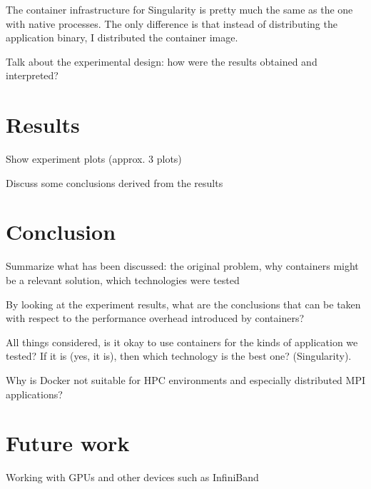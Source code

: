 \documentclass[12pt]{article}
\begin{document}
The container infrastructure for Singularity is pretty much the same
as the one with native processes. The only difference is that instead
of distributing the application binary, I distributed the container
image.

Talk about the experimental design: how were the results obtained and
interpreted?

\section{Results}
Show experiment plots (approx. 3 plots)

Discuss some conclusions derived from the results

\section{Conclusion}
Summarize what has been discussed: the original problem, why
containers might be a relevant solution, which technologies were
tested

By looking at the experiment results, what are the conclusions that
can be taken with respect to the performance overhead introduced by
containers?

All things considered, is it okay to use containers for the kinds of
application we tested? If it is (yes, it is), then which technology is
the best one? (Singularity).

Why is Docker not suitable for HPC environments and especially
distributed MPI applications?

\section{Future work}
Working with GPUs and other devices such as InfiniBand

 
\end{document}
